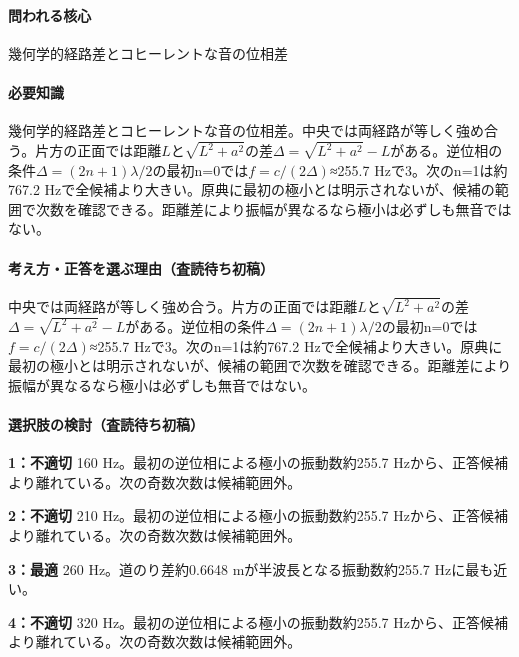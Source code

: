 \paragraph{問われる核心} 幾何学的経路差とコヒーレントな音の位相差

\paragraph{必要知識} 幾何学的経路差とコヒーレントな音の位相差。中央では両経路が等しく強め合う。片方の正面では距離\(L\)と\(\sqrt{L^2+a^2}\)の差\(\Delta=\sqrt{L^2+a^2}-L\)がある。逆位相の条件\(\Delta=(2n+1)\lambda/2\)の最初n=\allowbreak{}0では\(f=c/(2\Delta)\)≈255.7 Hzで3。次のn=\allowbreak{}1は約767.2 Hzで全候補より大きい。原典に最初の極小とは明示されないが、候補の範囲で次数を確認できる。距離差により振幅が異なるなら極小は必ずしも無音ではない。

\paragraph{考え方・正答を選ぶ理由（査読待ち初稿）} 中央では両経路が等しく強め合う。片方の正面では距離\(L\)と\(\sqrt{L^2+a^2}\)の差\(\Delta=\sqrt{L^2+a^2}-L\)がある。逆位相の条件\(\Delta=(2n+1)\lambda/2\)の最初n=\allowbreak{}0では\(f=c/(2\Delta)\)≈255.7 Hzで3。次のn=\allowbreak{}1は約767.2 Hzで全候補より大きい。原典に最初の極小とは明示されないが、候補の範囲で次数を確認できる。距離差により振幅が異なるなら極小は必ずしも無音ではない。

\paragraph{選択肢の検討（査読待ち初稿）}\mbox{}\par

\noindent\textbf{1：不適切} 160 Hz。最初の逆位相による極小の振動数約255.7 Hzから、正答候補より離れている。次の奇数次数は候補範囲外。\par

\noindent\textbf{2：不適切} 210 Hz。最初の逆位相による極小の振動数約255.7 Hzから、正答候補より離れている。次の奇数次数は候補範囲外。\par

\noindent\textbf{3：最適} 260 Hz。道のり差約0.6648 mが半波長となる振動数約255.7 Hzに最も近い。\par

\noindent\textbf{4：不適切} 320 Hz。最初の逆位相による極小の振動数約255.7 Hzから、正答候補より離れている。次の奇数次数は候補範囲外。\par

